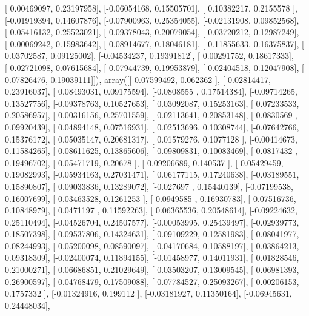 \documentclass{article}
\begin{document}
       [ 0.00469097,  0.23197958],
       [-0.06054168,  0.15505701],
       [ 0.10382217,  0.2155578 ],
       [-0.01919394,  0.14607876],
       [-0.07900963,  0.25354055],
       [-0.02131908,  0.09852568],
       [-0.05416132,  0.25523021],
       [-0.09378043,  0.20079054],
       [ 0.03720212,  0.12987249],
       [-0.00069242,  0.15983642],
       [ 0.08914677,  0.18046181],
       [ 0.11855633,  0.16375837],
       [ 0.03702587,  0.09125002],
       [-0.04534237,  0.19391812],
       [ 0.00291752,  0.18617333],
       [-0.02721098,  0.07615684],
       [-0.07944739,  0.19953879],
       [-0.02404518,  0.12047908],
       [ 0.07826476,  0.19039111]]), array([[-0.07599492,  0.062362  ],
       [ 0.02814417,  0.23916037],
       [ 0.08493031,  0.09175594],
       [-0.0808555 ,  0.17514384],
       [-0.09714265,  0.13527756],
       [-0.09378763,  0.10527653],
       [ 0.03092087,  0.15253163],
       [ 0.07233533,  0.20586957],
       [-0.00316156,  0.25701559],
       [-0.02113641,  0.20853148],
       [-0.0830569 ,  0.09920439],
       [ 0.04894148,  0.07516931],
       [ 0.02513696,  0.10308744],
       [-0.07642766,  0.15376172],
       [ 0.05035147,  0.20681317],
       [ 0.01579276,  0.1077128 ],
       [-0.00414673,  0.11584265],
       [ 0.08611625,  0.13865606],
       [ 0.09809831,  0.10083469],
       [ 0.0817432 ,  0.19496702],
       [-0.05471719,  0.20678   ],
       [-0.09206689,  0.140537  ],
       [ 0.05429459,  0.19082993],
       [-0.05934163,  0.27031471],
       [ 0.06177115,  0.17240638],
       [-0.03189551,  0.15890807],
       [ 0.09033836,  0.13289072],
       [-0.027697  ,  0.15440139],
       [-0.07199538,  0.16007699],
       [ 0.03463528,  0.1261253 ],
       [ 0.0949585 ,  0.16930783],
       [ 0.07516736,  0.10848979],
       [ 0.0471197 ,  0.11592263],
       [ 0.06365536,  0.20548614],
       [-0.09224632,  0.25110494],
       [-0.04526704,  0.24507577],
       [-0.00053995,  0.25439497],
       [-0.02939773,  0.18507398],
       [-0.09537806,  0.14324631],
       [ 0.09109229,  0.12581983],
       [-0.08041977,  0.08244993],
       [ 0.05200098,  0.08590097],
       [ 0.04170684,  0.10588197],
       [ 0.03864213,  0.09318309],
       [-0.02400074,  0.11894155],
       [-0.01458977,  0.14011931],
       [ 0.01828546,  0.21000271],
       [ 0.06686851,  0.21029649],
       [ 0.03503207,  0.13009545],
       [ 0.06981393,  0.26900597],
       [-0.04768479,  0.17509088],
       [-0.07784527,  0.25093267],
       [ 0.00206153,  0.1757332 ],
       [-0.01324916,  0.199112  ],
       [-0.03181927,  0.11350164],
       [-0.06945631,  0.24448034],
\end{document}
